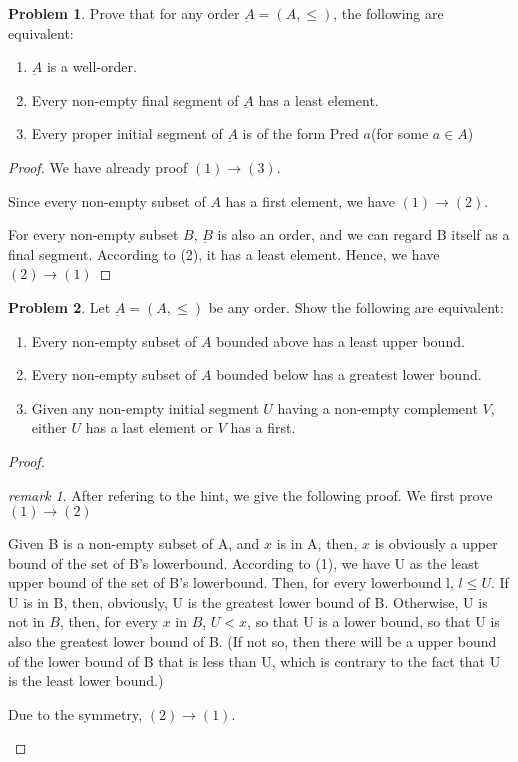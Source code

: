 \documentclass[a4paper,11pt]{article}%
\theoremstyle{remark}
\newtheorem*{remark}{remark}
\theoremstyle{definition}
\newtheorem{problem}{Problem}[subsection]
\begin{document}
\begin{problem}
    Prove that for any order $\underbar{A}=(A,\leq)$, the following are equivalent:
    \begin{enumerate}
        \item $\underbar{A}$ is a well-order.
        \item Every non-empty final segment of $\underbar{A}$ has a least element.
        \item Every proper initial segment of $\underbar{A}$ is of the form Pred $a$(for some $a\in A$)
    \end{enumerate}
    \begin{proof}
        We have already proof $(1)\rightarrow(3)$.

        Since every non-empty subset of $A$ has a first element, we have $(1)\rightarrow(2)$.

        For every non-empty subset $B$, $\underbar{B}$ is also an order, and we can 
        regard B itself as a final segment. According to (2), it has a least element.
        Hence, we have $(2)\rightarrow(1)$
    \end{proof}
\end{problem}
\begin{problem}
    Let $\underbar{A}=(A,\leq)$ be any order. Show the following are equivalent:
    \begin{enumerate}
        \item Every non-empty subset of $A$ bounded above has a least upper bound.
        \item Every non-empty subset of $A$ bounded below has a greatest lower bound.
        \item Given any non-empty initial segment $U$ having a non-empty complement $V$,
        either $U$ has a last element or $V$  has a first.
    \end{enumerate}
    \begin{proof}
    \begin{remark}
        After refering to the hint, we give the following proof. We 
        first prove $(1)\rightarrow(2)$

        Given B is a non-empty subset of A, and $x$ is in A,
        then, $x$ is obviously a upper bound of the set of B's lowerbound.
        According to (1), we have U as the least upper bound of the 
        set of B's lowerbound. Then, for every lowerbound l, $l \leq U$.
        If U is in B, then, obviously, U is the greatest lower bound of B.
        Otherwise, U is not in $B$, then, for every $x$ in $B$, $U<x$,
        so that U is a lower bound, so that U is also the greatest lower bound of B.
        (If not so, then there will be a upper bound of the lower bound of B that is less than
        U, which is contrary to the fact that U is the least lower bound.)

        Due to the symmetry, $(2)\rightarrow(1)$.
    \end{remark}
    \end{proof}
\end{problem}
\end{document}
